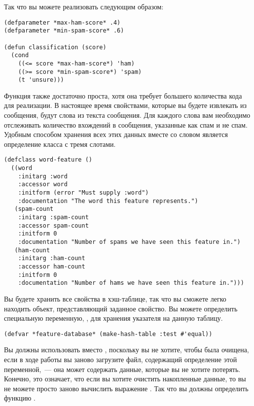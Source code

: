 Так что вы можете реализовать  следующим образом:

\begin{lstlisting}
(defparameter *max-ham-score* .4)
(defparameter *min-spam-score* .6)

(defun classification (score)
  (cond
    ((<= score *max-ham-score*) 'ham)
    ((>= score *min-spam-score*) 'spam)
    (t 'unsure)))
\end{lstlisting}

Функция  также достаточно проста, хотя она требует большего
количества кода для реализации.  В настоящее время свойствами, которые вы будете
извлекать из сообщения, будут слова из текста сообщения.  Для каждого слова вам необходимо
отслеживать количество вхождений в сообщения, указанные как спам и не спам.  Удобным
способом хранения всех этих данных вместе со словом является определение класса
 с тремя слотами.

\begin{lstlisting}
(defclass word-feature ()
  ((word       
    :initarg :word
    :accessor word
    :initform (error "Must supply :word")
    :documentation "The word this feature represents.")
   (spam-count
    :initarg :spam-count
    :accessor spam-count
    :initform 0
    :documentation "Number of spams we have seen this feature in.")
   (ham-count
    :initarg :ham-count
    :accessor ham-count
    :initform 0
    :documentation "Number of hams we have seen this feature in.")))
\end{lstlisting}

Вы будете хранить все свойства в хэш-таблице, так что вы сможете легко находить объект,
представляющий заданное свойство.  Вы можете определить специальную переменную,
, для хранения указателя на данную таблицу.

\begin{lstlisting}
(defvar *feature-database* (make-hash-table :test #'equal))
\end{lstlisting}

Вы должны использовать  вместо , поскольку вы не хотите,
чтобы  была очищена, если в ходе работы вы заново загрузите файл,
содержащий определение этой переменной,~--- она может содержать данные, которые вы не
хотите потерять.  Конечно, это означает, что если вы хотите очистить накопленные данные,
то вы не можете просто заново вычислить выражение .  Так что вы должны
определить функцию .


